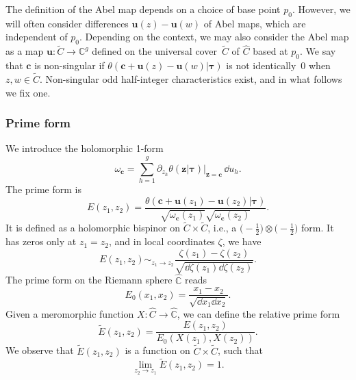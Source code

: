 \documentclass[10pt,a4paper]{amsart}
\numberwithin{equation}{section}
\begin{document}
The definition of the Abel map depends on a choice of base point $p_{0}$.
However, we will often consider differences $\bm{u}(z) - \bm{u}(w)$ of Abel
maps, which are independent of $p_{0}$. Depending on the context, we may also consider the Abel map as a map $\bm{u} \colon \widetilde{C} \rightarrow \mathbb{C}^g$ defined on the universal cover~$\widetilde{C}$ of $\widehat{C}$ based at $p_0$. We say that $\boldsymbol{c}$ is non-singular if $\theta(\bm{c} + \bm{u}(z) - \bm{u}(w)|\bm{\tau})$ is not identically~$0$ when $z,w \in \widetilde{C}$. Non-singular odd half-integer characteristics exist, and in what follows we fix one. 


\subsubsection{Prime form}

We introduce the holomorphic 1-form
\begin{equation*}
 \omega_{\bm{c}} = \sum_{h=1}^{g}\partial_{z_{h}}\theta(\bm{z}|\bm{\tau})\big|_{\bm{z} = \bm{c}}\,\dd u_{h}.
\end{equation*}
The prime form is
\begin{equation}
\label{Eprimtheta}
E(z_1,z_2) = \frac{\theta(\bm{c} + \bm{u}(z_1) - \bm{u}(z_2)|\bm{\tau})}{\sqrt{\omega_{\bm{c}}(z_1)}\sqrt{\omega_{\bm{c}}(z_2)}}.
\end{equation}
It is defined as a holomorphic bispinor on $\widetilde{C} \times \widetilde{C}$, i.e., a $\bigl(-\frac{1}{2}\bigr) \otimes \bigl(-\frac{1}{2}\bigr)$ form. It has zeros only at $z_1 = z_2$, and in local coordinates $\zeta$, we have
\[
E(z_1,z_2) \mathop{\sim}_{z_1 \rightarrow z_2} \frac{\zeta(z_1) - \zeta(z_2)}{\sqrt{\dd \zeta(z_1) \dd \zeta(z_2)}}.
\]
The prime form on the Riemann sphere $\widehat{\mathbb{C}}$ reads
\[
E_0(x_1,x_2) = \frac{x_1 - x_2}{\sqrt{\dd x_1 \dd x_2}}.
\]
Given a meromorphic function $X \colon \widehat{C} \rightarrow \widehat{\mathbb{C}}$, we can define the relative prime form
\begin{equation*}
\tilde{E}(z_1,z_2) = \frac{E(z_1,z_2)}{E_0(X(z_1),X(z_2))}.
\end{equation*}
We observe that $\tilde{E}(z_1,z_2)$ is a function on $\widetilde{C} \times \widetilde{C}$, such that
\begin{equation}
\label{limEtilde} \lim_{z_2 \rightarrow z_1} \tilde{E}(z_1,z_2) = 1.
\end{equation}
\end{document}
